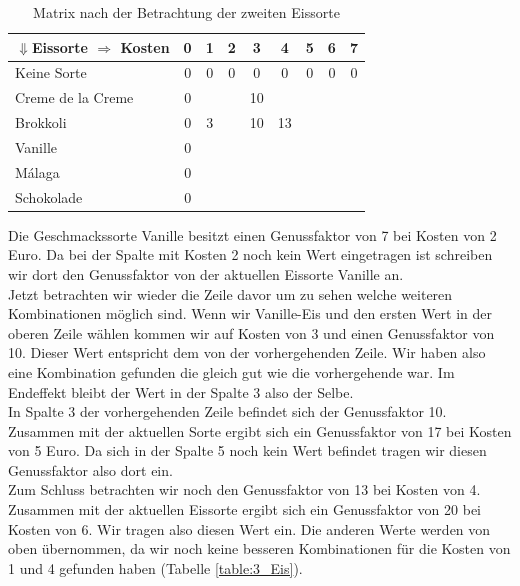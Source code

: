 \documentclass[a4paper, 12pt]{article}
\begin{document}
\begin{table}[H]
	\begin{center}
		\begin{tabular}{l|cccccccc}
			$\Downarrow$Eissorte $\Rightarrow$ Kosten & 0 & 1 & 2 & 3 & 4 & 5 &
			6 & 7\\
			\hline
			Keine Sorte			& 0 & 0 & 0 & 0	 &	0 & 0	& 0 & 0 \\
			Creme de la Creme	& 0 &	&	& 10 &	  & &	&	\\
			Brokkoli			& 0 & 3 &	& 10 & 13 & &	&	\\
			Vanille				& 0 &	&	&	 &	  & &	&	\\
			Málaga				& 0 &	&	&	 &	  & &	&	\\
			Schokolade			& 0 &	&	&	 &	  & &	&	\\
		\end{tabular}
	\end{center}
\caption{Matrix nach der Betrachtung der zweiten Eissorte}
\label{table:2_Eis}
\end{table}

Die Geschmackssorte Vanille besitzt einen Genussfaktor von 7 bei Kosten von 2 Euro. Da bei der Spalte mit Kosten 2 noch kein Wert eingetragen ist schreiben wir dort den Genussfaktor von der aktuellen Eissorte Vanille an.\\

Jetzt betrachten wir wieder die Zeile davor um zu sehen welche weiteren Kombinationen möglich sind. Wenn wir Vanille-Eis und den ersten Wert in der oberen Zeile wählen kommen wir auf Kosten von 3 und einen Genussfaktor von 10. Dieser Wert entspricht dem von der vorhergehenden Zeile. Wir haben also eine Kombination gefunden die gleich gut wie die vorhergehende war. Im Endeffekt bleibt der Wert in der Spalte 3 also der Selbe.\\

In Spalte 3 der vorhergehenden Zeile befindet sich der Genussfaktor 10. Zusammen mit der aktuellen Sorte ergibt sich ein Genussfaktor von 17 bei Kosten von 5 Euro. Da sich in der Spalte 5 noch kein Wert befindet tragen wir diesen Genussfaktor also dort ein.\\

Zum Schluss betrachten wir noch den Genussfaktor von 13 bei Kosten von 4. Zusammen mit der aktuellen Eissorte ergibt sich ein Genussfaktor von 20 bei Kosten von 6. Wir tragen also diesen Wert ein. Die anderen Werte werden von oben übernommen, da wir noch keine besseren Kombinationen für die Kosten von 1 und 4 gefunden haben (Tabelle \ref{table:3_Eis}).
\end{document}
